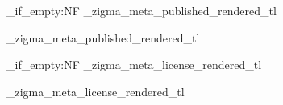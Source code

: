 {{        %
        \tl_if_empty:NF \g_zigma_meta_published_rendered_tl
          {
            \noindent
            {\small\g_zigma_meta_published_rendered_tl}
            \par
          }
        
        \tl_if_empty:NF \g_zigma_meta_license_rendered_tl
          {
            \vspace{0.5em}
            \noindent
            {\small\g_zigma_meta_license_rendered_tl}
            \par
          }
        
        \vspace{0.8em}
        \noindent
        \hrulefill
        \par
        \vspace{1em}
      }
  }


